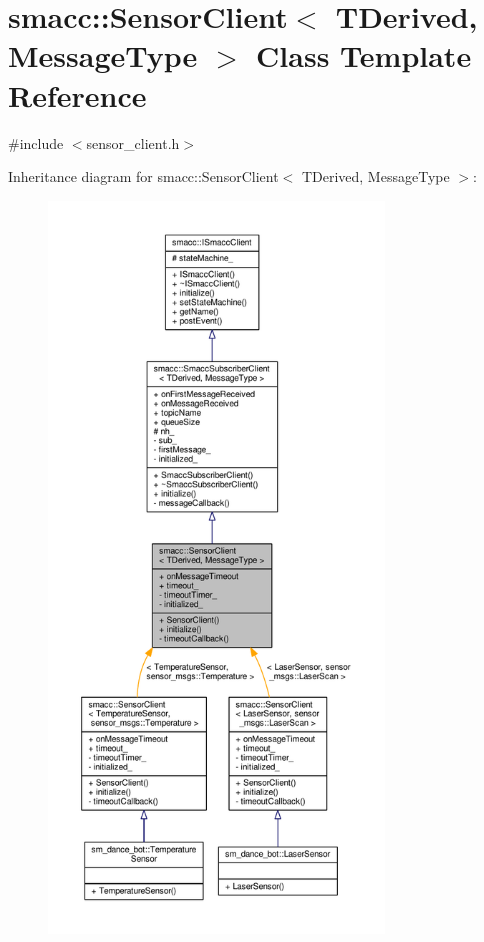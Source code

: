\hypertarget{classsmacc_1_1SensorClient}{}\section{smacc\+:\+:Sensor\+Client$<$ T\+Derived, Message\+Type $>$ Class Template Reference}
\label{classsmacc_1_1SensorClient}


{\ttfamily \#include $<$sensor\+\_\+client.\+h$>$}



Inheritance diagram for smacc\+:\+:Sensor\+Client$<$ T\+Derived, Message\+Type $>$\+:
\nopagebreak
\begin{figure}[H]
\begin{center}
\leavevmode
\includegraphics[height=550pt]{classsmacc_1_1SensorClient__inherit__graph}
\end{center}
\end{figure}


